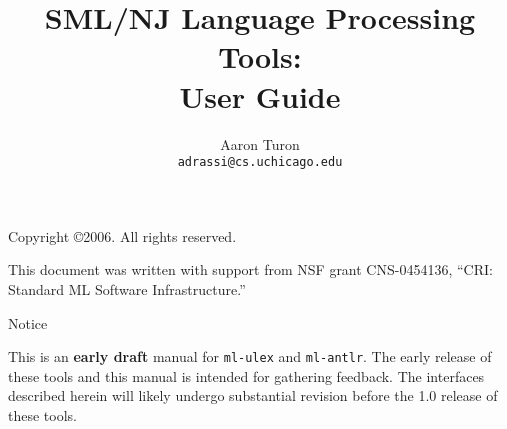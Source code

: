\documentclass[10pt,letterpaper]{book}
\title{SML/NJ Language Processing Tools:\\
User Guide}
\author{Aaron Turon\\
\texttt{adrassi@cs.uchicago.edu}}
\begin{document}
\frontmatter

	\maketitle
	
	\phantom{.}
	
	\noindent Copyright \copyright{}2006.  All rights reserved.
	
	\vskip 12pt
	\noindent This document was written with support from NSF grant CNS-0454136, ``CRI: Standard ML Software Infrastructure.''
	
	\pagebreak
	
	\tableofcontents

\mainmatter


    \newpage
    \phantom{.}
	\vskip 72pt
	\begin{center}
	{\Huge Notice}
	\end{center}
	\vskip 20pt \noindent
	{\Large This is an \textbf{early draft} manual for {\tt ml-ulex} and {\tt ml-antlr}.  The early release of these tools and this manual is intended for gathering feedback.  The interfaces described herein will likely undergo substantial revision before the 1.0 release of these tools.}
	
	\newpage

	
	

	
		
		
		
	
%	
%		
%		


%		
%		


%	
%	
\end{document}
